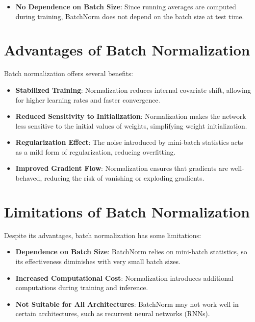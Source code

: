 \begin{notechapter}
\begin{itemize}
    \item \textbf{No Dependence on Batch Size}:
    Since running averages are computed during training, BatchNorm does
    not depend on the batch size at test time.
\end{itemize}

\section{Advantages of Batch Normalization}
Batch normalization offers several benefits:

\begin{itemize}
    \item \textbf{Stabilized Training}:
    Normalization reduces internal covariate shift, allowing for higher
    learning rates and faster convergence.

    \item \textbf{Reduced Sensitivity to Initialization}:
    Normalization makes the network less sensitive to the initial values
    of weights, simplifying weight initialization.

    \item \textbf{Regularization Effect}:
    The noise introduced by mini-batch statistics acts as a mild form
    of regularization, reducing overfitting.

    \item \textbf{Improved Gradient Flow}:
    Normalization ensures that gradients are well-behaved, reducing the
    risk of vanishing or exploding gradients.
\end{itemize}

\section{Limitations of Batch Normalization}
Despite its advantages, batch normalization has some limitations:

\begin{itemize}
    \item \textbf{Dependence on Batch Size}:
    BatchNorm relies on mini-batch statistics, so its effectiveness
    diminishes with very small batch sizes.

    \item \textbf{Increased Computational Cost}:
    Normalization introduces additional computations during training
    and inference.

    \item \textbf{Not Suitable for All Architectures}:
    BatchNorm may not work well in certain architectures, such as
    recurrent neural networks (RNNs).
\end{itemize}


\end{notechapter}
